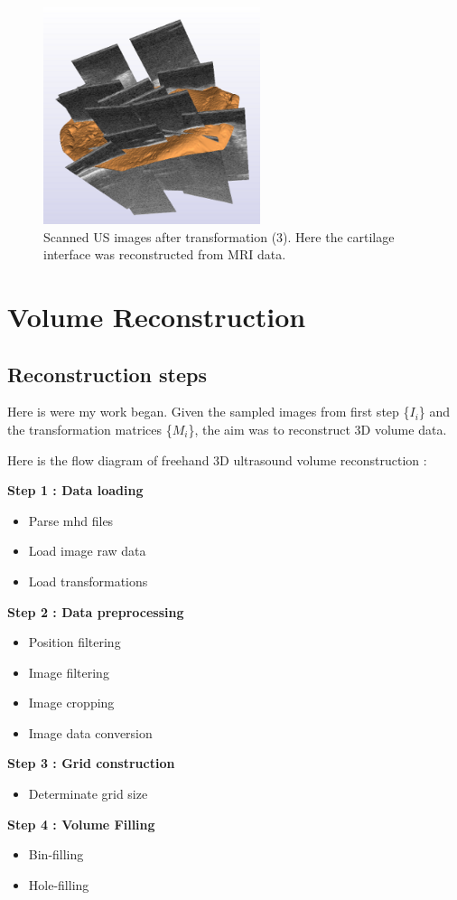 \documentclass[12pt,journal,compsoc]{IEEEtran}
\begin{document}
\begin{figure}[ht!]
\centering
\includegraphics[width=2.5in]{us_images}
\caption{Scanned US images after transformation (3). Here the cartilage interface was reconstructed from MRI data.}
\label{system}
\end{figure}


\section{Volume Reconstruction}

\subsection{Reconstruction steps}

Here is were my work began.
Given the sampled images from first step \{$I_i$\} and the transformation matrices \{$M_i$\}, the aim was to reconstruct 3D volume data.

\vspace{0.5cm}
Here is the flow diagram of freehand 3D ultrasound volume reconstruction :
\vspace{0.5cm}
\begin{framed}
\noindent\textbf{Step 1 : Data loading}
\begin{itemize}
	\item Parse mhd files
	\item Load image raw data
	\item Load transformations
\end{itemize}
\textbf{Step 2 : Data preprocessing}
\begin{itemize}
	\item Position filtering
	\item Image filtering
	\item Image cropping
	\item Image data conversion
\end{itemize}
\textbf{Step 3 : Grid construction}
\begin{itemize}
	\item Determinate grid size
\end{itemize}
\textbf{Step 4 : Volume Filling}
\begin{itemize}
	\item Bin-filling
	\item Hole-filling
\end{itemize}
\end{framed}
\end{document}
